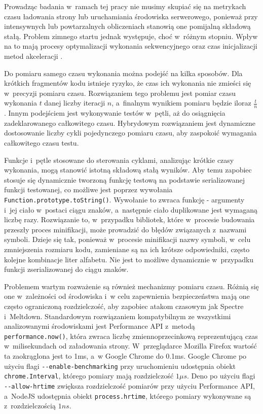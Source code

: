 Prowadząc badania w~ramach tej pracy nie musimy skupiać się na metrykach czasu ładowania strony lub uruchamiania środowiska serwerowego, ponieważ przy intensywnych lub powtarzalnych obliczeniach stanowią one pomijalną składową stałą.
Problem zimnego startu jednak występuje, choć w~różnym stopniu. Wpływ na to mają procesy optymalizacji wykonania sekwencyjnego oraz czas inicjalizacji metod akceleracji \cite{je-benchmarking}.

Do pomiaru samego czasu wykonania można podejść na kilka sposobów. Dla krótkich fragmentów kodu istnieje ryzyko, że czas ich wykonania nie zmieści się w~precyzji pomiaru czasu. Rozwiązaniem tego problemu jest pomiar czasu wykonania $t$ danej liczby iteracji $n$, a~finalnym wynikiem pomiaru będzie iloraz $\frac{t}{n}$. Innym podejściem jest wykonywanie testów w~pętli, aż do osiągnięcia zadeklarowanego całkowitego czasu. Hybrydowym rozwiązaniem jest dynamiczne dostosowanie liczby cykli pojedynczego pomiaru czasu, aby zaspokoić wymagania całkowitego czasu testu.

Funkcje i~pętle stosowane do sterowania cyklami, analizując krótkie czasy wykonania, mogą stanowić istotną składową stałą wyników. Aby temu zapobiec stosuje się dynamicznie tworzoną funkcję testową na podstawie serializowanej funkcji testowanej, co możliwe jest poprzez wywołania \lstinline{Function.prototype.toString()}. Wywołanie to zwraca funkcję - argumenty i~jej ciało w~postaci ciągu znaków, a~następnie ciało duplikowane jest wymaganą liczbę razy. Rozwiązanie to, w~przypadku bibliotek, które w~procesie budowania przeszły proces minifikacji, może prowadzić do błędów związanych z~nazwami symboli. Dzieje się tak, ponieważ w~procesie minifikacji nazwy symboli, w~celu zmniejszenia rozmiaru kodu, zamieniane są na ich krótsze odpowiedniki, często kolejne kombinacje liter alfabetu. Nie jest to możliwe dynamicznie w~przypadku funkcji zserializowanej do ciągu znaków.

Problemem wartym rozważenie są również mechanizmy pomiaru czasu. Różnią się one w~zależności od środowiska i~w celu zapewnienia bezpieczeństwa mają one często ograniczoną rozdzielczość, aby zapobiec atakom czasowym jak Spectre i~Meltdown. Standardowym rozwiązaniem kompatybilnym ze wszystkimi analizowanymi środowiskami jest Performance API z~metodą \lstinline{performance.now()}, która zwraca liczbę zmiennoprzecinkową reprezentującą czas w~milisekundach od załadowania strony. W~przeglądarce Mozilla Firefox wartość ta zaokrąglona jest to 1ms, a~w Google Chrome do 0.1ms. Google Chrome po użyciu flagi \mbox{\lstinline{--enable-benchmarking}} przy uruchomieniu udostępnia obiekt \lstinline{chrome.Interval}, którego pomiary mają rozdzielczość $1 {\mu}s$. Deno po użyciu flagi \lstinline{--allow-hrtime} zwiększa rozdzielczość pomiarów przy użyciu Performance API, a~NodeJS udostępnia obiekt \lstinline{process.hrtime}, którego pomiary wykonywane są z~rozdzielczością $1ns$.


